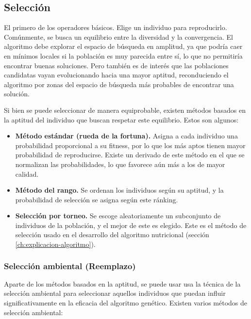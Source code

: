 \subsection{Selección}
\label{Seleccion}

El primero de los operadores básicos. Elige un individuo para reproducirlo. Comúnmente, se busca un equilibrio entre la diversidad y la convergencia. El algoritmo debe explorar el espacio de búsqueda en amplitud, ya que podría caer en mínimos locales si la población es muy parecida entre sí, lo que no permitiría encontrar buenas soluciones. Pero también es de interés que las poblaciones candidatas vayan evolucionando hacia una mayor aptitud, reconduciendo el algoritmo por zonas del espacio de búsqueda más probables de encontrar una solución.

Si bien se puede seleccionar de manera equiprobable, existen métodos basados en la aptitud del individuo que buscan respetar este equilibrio. Estos son algunos:

\begin{itemize}
  \item \textbf{Método estándar (rueda de la fortuna).} Asigna a cada individuo una probabilidad proporcional a su fitness, por lo que los más aptos tienen mayor probabilidad de reproducirse. Existe un derivado de este método en el que se normalizan las probabilidades, lo que favorece aún más a los de mayor calidad.\newpage
  \item \textbf{Método del rango.} Se ordenan los individuos según su aptitud, y la probabilidad de selección se asigna según este ránking.
  \item \textbf{Selección por torneo.} Se escoge aleatoriamente un subconjunto de individuos de la población, y el mejor de este es elegido. Este es el método de selección usado en el desarrollo del algoritmo nutricional (sección \ref{ch:explicacion-algoritmo}).
\end{itemize}

\subsubsection{Selección ambiental (Reemplazo)}

Aparte de los métodos basados en la aptitud, se puede usar usa la técnica de la selección ambiental para seleccionar aquellos individuos que puedan influir significativamente en la eficacia del algoritmo genético. Existen varios métodos de selección ambiental:

